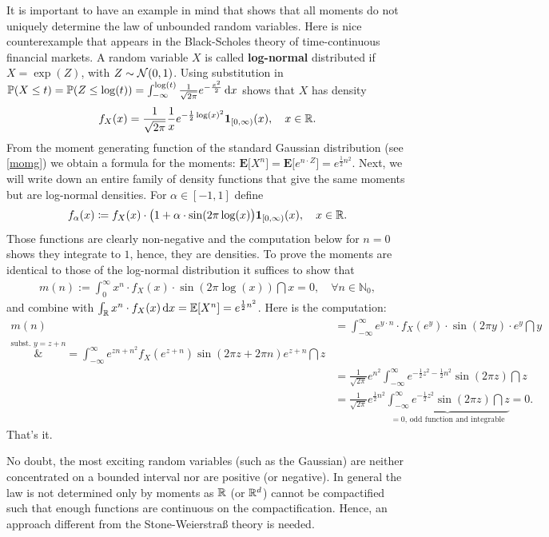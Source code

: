 It is important to have an example in mind that shows that all moments do not uniquely determine the law of unbounded random variables. Here is nice counterexample that appears in the Black-Scholes theory of time-continuous financial markets. A random variable $X$ is called \textbf{log-normal} distributed if $X = \exp(Z)$, with $Z \sim \mathcal{N}(0,1)$. Using substitution in $\mathbb P(X\leq t)=\mathbb P(Z\leq \log(t))=\int_{-\infty}^{\log(t)} \frac{1}{\sqrt{2\pi}} e^{-\frac{x^2}{2}}\, \mathrm{d} x$ shows that $X$ has density $$ f_X(x) = \frac{1}{\sqrt{2 \pi}} \frac{1}{x} e^{- \frac{1}{2} \log(x)^2}\mathbf 1_{[0,\infty)}(x),\quad x\in\mathbb{R}.$$ From the moment generating function of the standard Gaussian distribution (see \ref{momg}) we obtain a formula for the moments: $\mathbf E\big[X^n \big] = \mathbf E \big[ e^{n\cdot Z} \big] = e^{\frac{1}{2}n^2}$. Next, we will write down an entire family of density functions that give the same moments but are log-normal densities. For $\alpha \in [-1,1]$ define
\begin{align*}
	f_{\alpha}(x) \coloneqq f_X(x) \cdot \big( 1 + \alpha \cdot \sin(2 \pi \log(x) \big)\mathbf 1_{[0,\infty)}(x),\quad x\in\mathbb{R}.
\end{align*}
Those functions are clearly non-negative and the computation below for $n=0$ shows they integrate to $1$, hence, they are densities. To prove the moments are identical to those of the log-normal distribution it suffices to show that 
\begin{align*}
	m(n) := \int_0^{\infty} x^n \cdot f_X(x) \cdot \sin(2 \pi \log(x)) \dint x = 0,\quad \forall n \in \mathbb{N}_0,
\end{align*}
and combine with $\int_{\mathbb{R}} x^n\cdot f_X(x)\, \mathrm{d} x=\mathbb{E}[X^n]=e^{\frac{1}{2}n^2}$. Here is the computation:
\begin{align*}
	m(n) &= \int_{-\infty}^{\infty} e^{y\cdot n} \cdot f_X( e^y) \cdot \sin(2 \pi y ) \cdot e^y \dint y \\
		\overset{\text{subst. }y=z+n}&{=} \int_{-\infty}^{\infty} e^{zn + n^2} f_X(e^{z+n}) \sin(2 \pi z + 2 \pi n) e^{z+n} \dint z \\
		&= \frac{1}{\sqrt{2\pi}} e^{n^2} \int_{-\infty}^{\infty} e^{-\frac{1}{2}z^2-\frac{1}{2}n^2} \sin(2 \pi z) \dint z \\
		&= \frac{1}{\sqrt{2 \pi}} e^{\frac{1}{2}n^2} \underbrace{\int_{-\infty}^{\infty} e^{-\frac{1}{2}z^2} \sin(2 \pi z ) \dint z}_{ = 0 \text{, odd function and integrable}}=0.
\end{align*}
That's it.\smallskip

No doubt, the most exciting random variables (such as the Gaussian) are neither concentrated on a bounded interval nor are positive (or negative). In general the law is not determined only by moments as $\mathbb{R}$ (or $\mathbb{R}^d$) cannot be compactified such that enough functions are continuous on the compactification. Hence, an approach different from the Stone-Weierstra\ss{} theory is needed.\smallskip

